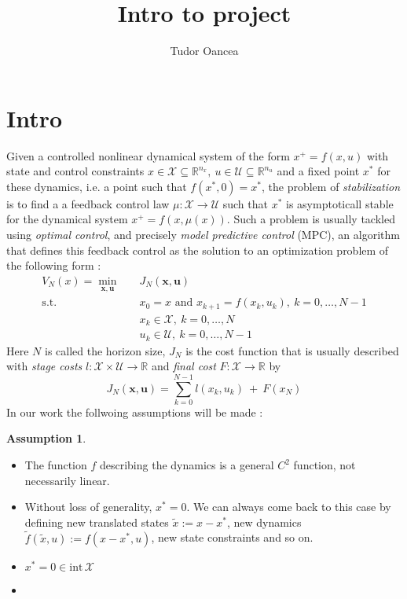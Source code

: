\documentclass[12pt]{article}
\title{Intro to project}
\author{Tudor Oancea}
\date{}
\theoremstyle{definition}
\newtheorem{assumption}[theorem]{Assumption}
\theoremstyle{remark}
\def\cal#1{\mathcal{#1}}
\newcommand{\R}{\mathbb{R}}
\begin{document}
\maketitle

\section{Intro}
Given a controlled nonlinear dynamical system of the form $x^+=f(x,u)$ with state and control constraints $x\in\cal{X}\subseteq\R^{n_x},~u\in\cal{U}\subseteq\R^{n_u}$ and a fixed point $x^*$ for these dynamics, i.e. a point such that $f(x^*,0)=x^*$, the problem of \textit{stabilization} is to find a a feedback control law $\mu:\cal{X}\to\cal{U}$ such that $x^*$ is asymptoticall stable for the dynamical system $x^+=f(x,\mu(x))$.
Such a problem is usually tackled using \textit{optimal control}, and precisely \textit{model predictive control} (MPC), an algorithm that defines this feedback control as the solution to an optimization problem of the following form :
\begin{align}
	V_N(x)=\underset{\mathbf{x},\mathbf{u}}{\min} &\quad J_N(\mathbf{x},\mathbf{u})\\
	\text{s.t.} &\quad x_0=x\text{ and }x_{k+1}=f(x_k,u_k),~k=0,\dots,N-1\\
	&\quad x_k\in\cal{X},~k=0,\dots,N\\
	&\quad u_k\in\cal{U},~k=0,\dots,N-1
\end{align}
Here $N$ is called the horizon size, $J_N$ is the cost function that is usually described with \textit{stage costs} $l:\cal{X}\times\cal{U}\to\R$ and \textit{final cost} $F:\cal{X}\to\R$ by 
$$J_N(\mathbf{x},\mathbf{u})=\sum_{k=0}^{N-1}l(x_k,u_k)~+~F(x_N)$$
In our work the follwoing assumptions will be made :
\begin{assumption}~
	\begin{itemize}[label=\textbullet]
		\item The function $f$ describing the dynamics is a general $C^2$ function, not necessarily linear.
		\item Without loss of generality, $x^*=0$. We can always come back to this case by defining new translated states $\tilde{x}:=x-x^*$, new dynamics $\tilde{f}(\tilde{x},u):=f(x-x^*,u)$, new state constraints and so on.
		\item $x^*=0\in\mathrm{int}\,\cal{X}$
		\item 
	\end{itemize}
\end{assumption}
\end{document}
